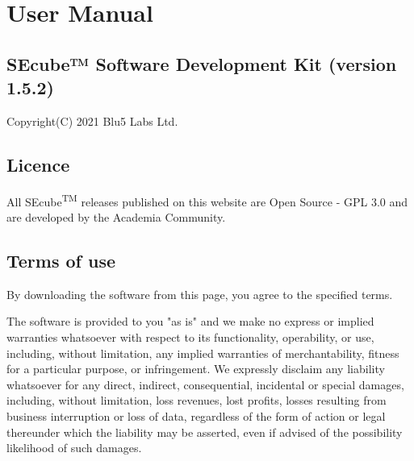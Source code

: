 \chapter{User Manual}
\label{usermanual}



\section {SEcube™ Software Development Kit (version 1.5.2)}
Copyright(C) 2021 Blu5 Labs Ltd.

\section {Licence}
All SEcube\textsuperscript{TM} releases published on this website are Open Source - GPL 3.0 and are developed by the Academia Community.

\section {Terms of use}
By downloading the software from this page, you agree to the specified terms.

The software is provided to you "as is" and we make no express or implied warranties whatsoever with respect to its functionality, operability, or use, including, without limitation, any implied warranties of merchantability, fitness for a particular purpose, or infringement. We expressly disclaim any liability whatsoever for any direct, indirect, consequential, incidental or special damages, including, without limitation, loss revenues, lost profits, losses resulting from business interruption or loss of data, regardless of the form of action or legal thereunder which the liability may be asserted, even if advised of the possibility likelihood of such damages.

